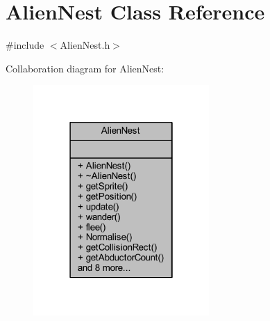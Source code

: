 \hypertarget{class_alien_nest}{}\section{Alien\+Nest Class Reference}
\label{class_alien_nest}


{\ttfamily \#include $<$Alien\+Nest.\+h$>$}



Collaboration diagram for Alien\+Nest\+:
\nopagebreak
\begin{figure}[H]
\begin{center}
\leavevmode
\includegraphics[width=190pt]{class_alien_nest__coll__graph}
\end{center}
\end{figure}
